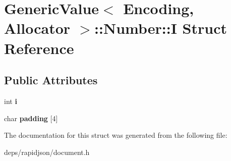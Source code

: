 \hypertarget{struct_generic_value_1_1_number_1_1_i}{}\section{Generic\+Value$<$ Encoding, Allocator $>$\+:\+:Number\+:\+:I Struct Reference}
\label{struct_generic_value_1_1_number_1_1_i}
\subsection*{Public Attributes}
\begin{DoxyCompactItemize}
\item 
int {\bfseries i}\hypertarget{struct_generic_value_1_1_number_1_1_i_ae0b250dc448d284cf9019f3932bfc380}{}\label{struct_generic_value_1_1_number_1_1_i_ae0b250dc448d284cf9019f3932bfc380}

\item 
char {\bfseries padding} \mbox{[}4\mbox{]}\hypertarget{struct_generic_value_1_1_number_1_1_i_a5b6ac51398ceb11c1abd733f0ae70461}{}\label{struct_generic_value_1_1_number_1_1_i_a5b6ac51398ceb11c1abd733f0ae70461}

\end{DoxyCompactItemize}


The documentation for this struct was generated from the following file\+:\begin{DoxyCompactItemize}
\item 
deps/rapidjson/document.\+h\end{DoxyCompactItemize}
